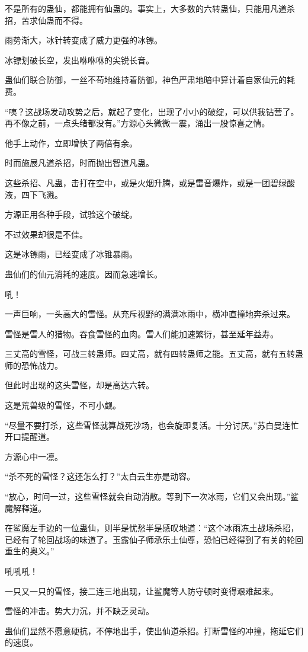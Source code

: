 \begin{this_body}
不是所有的蛊仙，都能拥有仙蛊的。事实上，大多数的六转蛊仙，只能用凡道杀招，苦求仙蛊而不得。

雨势渐大，冰针转变成了威力更强的冰镖。

冰镖划破长空，发出咻咻咻的尖锐长音。

蛊仙们联合防御，一丝不苟地维持着防御，神色严肃地暗中算计着自家仙元的耗费。

“咦？这战场发动攻势之后，就起了变化，出现了小小的破绽，可以供我钻营了。再不像之前，一点头绪都没有。”方源心头微微一震，涌出一股惊喜之情。

他手上动作，立即增快了两倍有余。

时而施展凡道杀招，时而抛出智道凡蛊。

这些杀招、凡蛊，击打在空中，或是火烟升腾，或是雷音爆炸，或是一团碧绿酸液，四下飞溅。

方源正用各种手段，试验这个破绽。

不过效果却很是不佳。

这是冰镖雨，已经变成了冰锥暴雨。

蛊仙们的仙元消耗的速度。因而急速增长。

吼！

一声巨响，一头高大的雪怪。从充斥视野的满满冰雨中，横冲直撞地奔杀过来。

雪怪是雪人的猎物。吞食雪怪的血肉。雪人们能加速繁衍，甚至延年益寿。

三丈高的雪怪，可战三转蛊师。四丈高，就有四转蛊师之能。五丈高，就有五转蛊师的恐怖战力。

但此时出现的这头雪怪，却是高达六转。

这是荒兽级的雪怪，不可小觑。

“尽量不要打杀，这些雪怪就算战死沙场，也会旋即复活。十分讨厌。”苏白曼连忙开口提醒道。

方源心中一凛。

“杀不死的雪怪？这还怎么打？”太白云生亦是动容。

“放心，时间一过，这些雪怪就会自动消散。等到下一次冰雨，它们又会出现。”鲨魔解释道。

在鲨魔左手边的一位蛊仙，则半是忧愁半是感叹地道：“这个冰雨冻土战场杀招，已经有了轮回战场的味道了。玉露仙子师承乐土仙尊，恐怕已经得到了有关的轮回重生的奥义。”

吼吼吼！

一只又一只的雪怪，接二连三地出现，让鲨魔等人防守顿时变得艰难起来。

雪怪的冲击。势大力沉，并不缺乏灵动。

蛊仙们显然不愿意硬抗，不停地出手，使出仙道杀招。打断雪怪的冲撞，拖延它们的速度。


\end{this_body}
